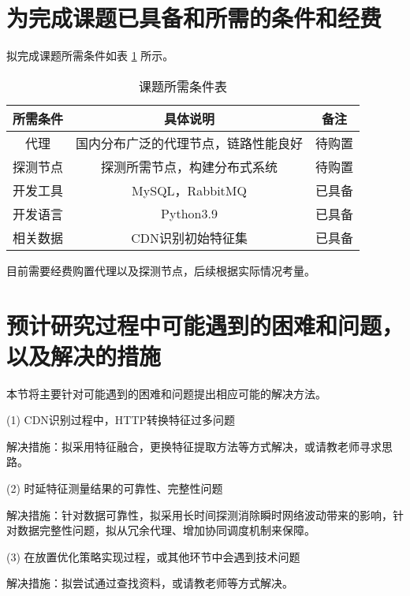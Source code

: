 
\section{为完成课题已具备和所需的条件和经费}

拟完成课题所需条件如表 \ref{table:课题所需条件表} 所示。

\begin{table}[htbp]
	\centering
	\caption{课题所需条件表}\label{table:课题所需条件表}
	\vspace{0.5em}\wuhao
	\begin{tabularx}{1\textwidth}{ccc}
		\toprule
		所需条件        & 具体说明     & 备注    \\
		\midrule
		代理           & 国内分布广泛的代理节点，链路性能良好           & 待购置      \\
		探测节点          & 探测所需节点，构建分布式系统  & 待购置  \\
		开发工具         & MySQL，RabbitMQ   & 已具备 \\
		开发语言           & Python3.9  & 已具备 \\
		相关数据          & CDN识别初始特征集 &     已具备     \\


		\bottomrule
	\end{tabularx}
\end{table}

目前需要经费购置代理以及探测节点，后续根据实际情况考量。

\section{预计研究过程中可能遇到的困难和问题，以及解决的措施}
本节将主要针对可能遇到的困难和问题提出相应可能的解决方法。

(1) CDN识别过程中，HTTP转换特征过多问题

解决措施：拟采用特征融合，更换特征提取方法等方式解决，或请教老师寻求思路。

(2) 时延特征测量结果的可靠性、完整性问题

解决措施：针对数据可靠性，拟采用长时间探测消除瞬时网络波动带来的影响，针对数据完整性问题，拟从冗余代理、增加协同调度机制来保障。

(3) 在放置优化策略实现过程，或其他环节中会遇到技术问题

解决措施：拟尝试通过查找资料，或请教老师等方式解决。


